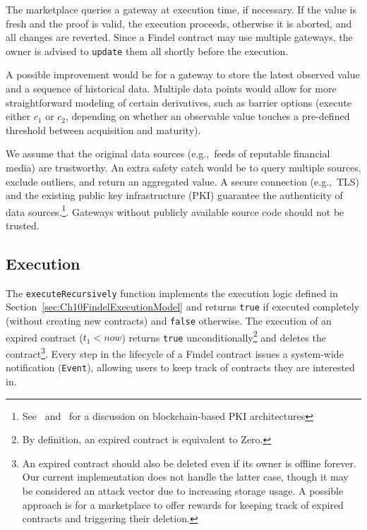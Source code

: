 The marketplace queries a gateway at execution time, if necessary.
If the value is fresh and the proof is valid, the execution proceeds, otherwise it is aborted, and all changes are reverted.
Since a Findel contract may use multiple gateways, the owner is advised to \texttt{update} them all shortly before the execution.

A possible improvement would be for a gateway to store the latest observed value and a sequence of historical data.
Multiple data points would allow for more straightforward modeling of certain derivatives, such as barrier options (execute either \(c_1\) or \(c_2\), depending on whether an observable value touches a pre-defined threshold between acquisition and maturity).

We assume that the original data sources (e.g.,~feeds of reputable financial media) are trustworthy.
An extra safety catch would be to query multiple sources, exclude outliers, and return an aggregated value.
A secure connection (e.g.,~TLS) and the existing public key infrastructure (PKI) guarantee the authenticity of data sources.\footnote{See~\cite{Fromknecht2014} and~\cite{Lewison2016} for a discussion on blockchain-based PKI architectures}.
Gateways without publicly available source code should not be trusted.


\subsection{Execution} \label{sec:Ch10FindelExecutionImplementation}

The \texttt{executeRecursively} function implements the execution logic defined in Section~\ref{sec:Ch10FindelExecutionModel} and returns \texttt{true} if executed completely (without creating new contracts) and \texttt{false} otherwise.
The execution of an expired contract ($t_1 < now$) returns \texttt{true} unconditionally\footnote{By definition, an expired contract is equivalent to \(\mathrm{Zero}\).} and deletes the contract\footnote{An expired contract should also be deleted even if its owner is offline forever. Our current implementation does not handle the latter case, though it may be considered an attack vector due to increasing storage usage. A possible approach is for a marketplace to offer rewards for keeping track of expired contracts and triggering their deletion.}.
Every step in the lifecycle of a Findel contract issues a system-wide notification (\texttt{Event}), allowing users to keep track of contracts they are interested in.

